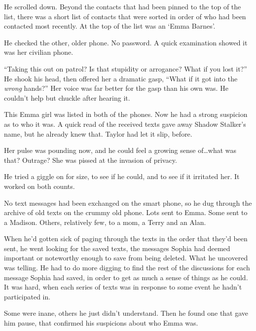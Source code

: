 He scrolled down.  Beyond the contacts that had been pinned to the top of the list, there was a short list of contacts that were sorted in order of who had been contacted most recently.  At the top of the list was an `Emma Barnes'.



He checked the other, older phone.  No password.  A quick examination showed it was her civilian phone.



``Taking this out on patrol?  Is that stupidity or arrogance?  What if you lost it?''  He shook his head, then offered her a dramatic gasp, ``What if it got into the \emph{wrong} hands?''  Her voice was far better for the gasp than his own was.  He couldn't help but chuckle after hearing it.



This Emma girl was listed in both of the phones.  Now he had a strong suspicion as to who it was.  A quick read of the received texts gave away Shadow Stalker's name, but he already knew that.  Taylor had let it slip, before.



Her pulse was pounding now, and he could feel a growing sense of\ldots what was that?  Outrage?  She was pissed at the invasion of privacy.



He tried a giggle on for size, to see if he could, and to see if it irritated her.  It worked on both counts.



No text messages had been exchanged on the smart phone, so he dug through the archive of old texts on the crummy old phone.  Lots sent to Emma.  Some sent to a Madison.  Others, relatively few, to a mom, a Terry and an Alan.



When he'd gotten sick of paging through the texts in the order that they'd been sent, he went looking for the saved texts, the messages Sophia had deemed important or noteworthy enough to save from being deleted.  What he uncovered was telling.  He had to do more digging to find the rest of the discussions for each message Sophia had saved, in order to get as much a sense of things as he could.  It was hard, when each series of texts was in response to some event he hadn't participated in.



Some were inane, others he just didn't understand.  Then he found one that gave him pause, that confirmed his suspicions about who Emma was.


